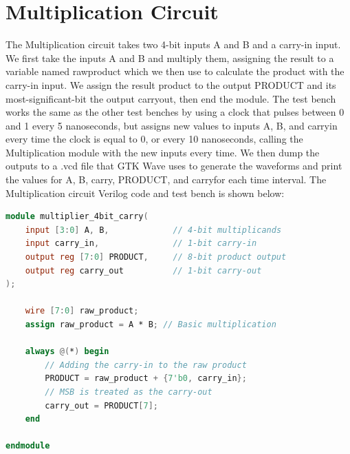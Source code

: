 \documentclass[runningheads, 12pt]{report}
\begin{document}
\section{Multiplication Circuit}

	The Multiplication circuit takes two 4-bit inputs A and B and a carry-in input. We first take the inputs A and B and multiply them, assigning the result to a variable named raw\textunderscore product which we then use to calculate the product with the carry-in input. We assign the result product to the output PRODUCT and its most-significant-bit the output carry\textunderscore out, then end the module. The test bench works the same as the other test benches by using a clock that pulses between 0 and 1 every 5 nanoseconds, but assigns new values to inputs A, B, and carry\textunderscore in every time the clock is equal to 0, or every 10 nanoseconds, calling the Multiplication module with the new inputs every time. We then dump the outputs to a .vcd file that GTK Wave uses to generate the waveforms and print the values for A, B, carry\textunderscorein, PRODUCT, and carry\textunderscoreout for each time interval. The Multiplication circuit Verilog code and test bench is shown below: 

\begin{lstlisting}[language=Verilog, caption={Multiplication Circuit Verilog}]
module multiplier_4bit_carry(
    input [3:0] A, B,             // 4-bit multiplicands
    input carry_in,               // 1-bit carry-in
    output reg [7:0] PRODUCT,     // 8-bit product output
    output reg carry_out          // 1-bit carry-out
);

    wire [7:0] raw_product;
    assign raw_product = A * B; // Basic multiplication
    
    always @(*) begin
    	// Adding the carry-in to the raw product
        PRODUCT = raw_product + {7'b0, carry_in};
        // MSB is treated as the carry-out  
        carry_out = PRODUCT[7];                    
    end

endmodule
\end{lstlisting}
	
\end{document}
